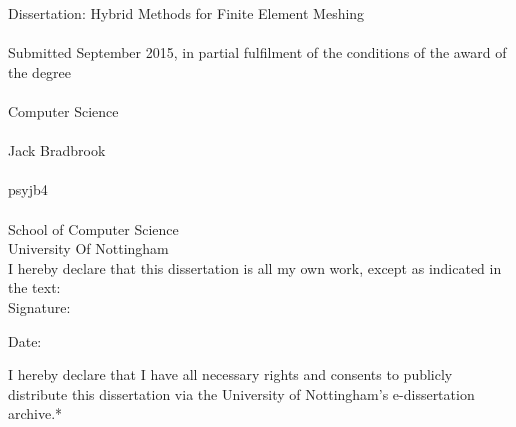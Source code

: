 \documentclass{article}
\begin{document}

Dissertation: Hybrid Methods for Finite Element Meshing \\ \\
Submitted September 2015, in partial fulfilment of
the conditions of the award of the degree \\ \\
Computer Science \\ \\
Jack Bradbrook \\ \\
psyjb4 \\ \\
School of Computer Science \\
University Of Nottingham \\ 

I hereby declare that this dissertation is all my own work, except as indicated
in the text: \\ 

Signature:


Date: 


I hereby declare that I have all necessary rights and consents  to publicly
distribute this dissertation via the University of Nottingham's e-dissertation
archive.*
\tableofcontents

\newpage











\end{document}
